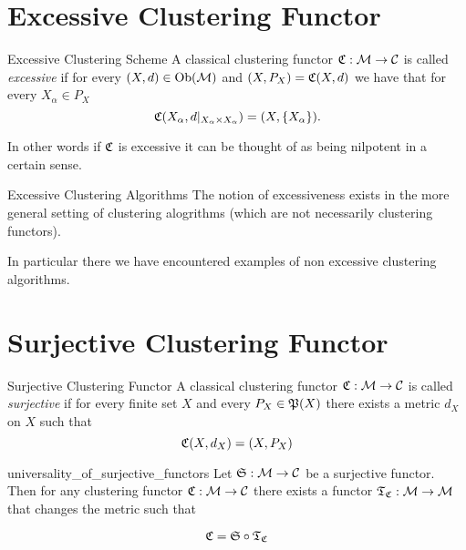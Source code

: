 

\section{Excessive Clustering Functor}
\begin{definition}{Excessive Clustering Scheme}{}
A classical clustering functor $\Cf: \M \to \C$ is called \emph{excessive} if for every $(X,d) \in \ob(\M)$ and $(X,P_X) = \Cf(X,d)$ we have that for every $X_\alpha \in P_X$
\begin{equation*}
    \Cf(X_\alpha, d|_{X_\alpha \times X_\alpha}) = (X,\{X_\alpha\}).
\end{equation*}
\end{definition}
In other words if $\Cf$ is excessive it can be thought of as being nilpotent in a certain sense.

\begin{myremark}{Excessive Clustering Algorithms}{}
The notion of excessiveness exists in the more general setting of clustering alogrithms (which are not necessarily clustering functors).
\end{myremark}

In particular there we have encountered examples of non excessive clustering algorithms.



\section{Surjective Clustering Functor}
\begin{definition}{Surjective Clustering Functor}{}
A classical clustering functor $\Cf: \M \to \C$ is called \emph{surjective} if for every finite set $X$ and every $P_X \in \P(X)$ there exists a metric $d_X$ on $X$ such that
\begin{equation*}
    \Cf(X,d_X) = (X,P_X)
\end{equation*}
\end{definition}



\begin{proposition}{}{universality_of_surjective_functors}
Let $\mathfrak{S}: \M \to \C$ be a surjective functor. Then for any clustering functor $\Cf: \M \to \C$ there exists a functor $\Tf_\Cf: \M \to \M$ that changes the metric such that

\begin{equation*}
\Cf = \mathfrak{S} \circ \Tf_\Cf
\end{equation*}
\end{proposition}


